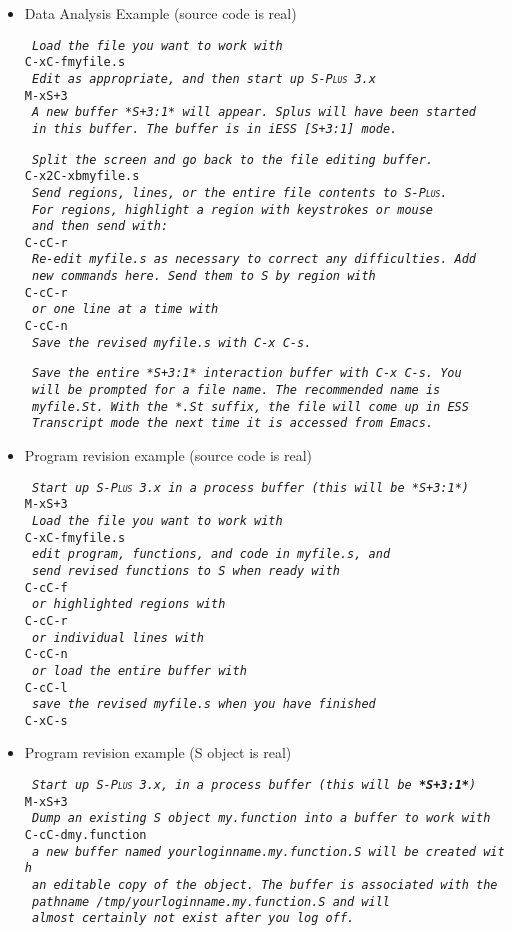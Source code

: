 \documentclass{article}
\newcommand*{\Splus}{\textsc{S-Plus}}
\newcommand*{\Scmt}[1]{\hbox{\qquad {\footnotesize \#\#} \textsl{#1}}}
\newenvironment{Salltt}{\small\begin{alltt}}{\end{alltt}}
\begin{document}
\begin{itemize}
\item Data Analysis Example (source code is real)
\begin{Salltt}
  \Scmt{Load the file you want to work with}
  C-x C-f myfile.s
  \Scmt{Edit as appropriate, and then start up \Splus~3.x}
  M-x S+3
  \Scmt{A new buffer *S+3:1* will appear.  Splus will have been started}
  \Scmt{in this buffer.  The buffer is in iESS [S+3:1] mode.}

  \Scmt{Split the screen and go back to the file editing buffer.}
  C-x 2 C-x b myfile.s
  \Scmt{Send regions, lines, or the entire file contents to \Splus.}
  \Scmt{For regions, highlight a region with keystrokes or mouse}
  \Scmt{and then send with:}
  C-c C-r
  \Scmt{Re-edit myfile.s as necessary to correct any difficulties.  Add}
  \Scmt{new commands here.  Send them to S by region with}
  C-c C-r
  \Scmt{or one line at a time with}
  C-c C-n
  \Scmt{Save the revised myfile.s with C-x C-s.}

  \Scmt{Save the entire *S+3:1* interaction buffer with C-x C-s.  You}
  \Scmt{will be prompted for a file name.  The recommended name is}
  \Scmt{myfile.St.  With the *.St suffix, the file will come up in ESS}
  \Scmt{Transcript mode the next time it is accessed from Emacs.}
  \end{Salltt}

\item Program revision example (source code is real)
  \begin{Salltt}
  \Scmt{Start up \Splus~3.x in a process buffer (this will be *S+3:1*)}
  M-x S+3
  \Scmt{Load the file you want to work with}
  C-x C-f myfile.s
  \Scmt{edit program, functions, and code in myfile.s, and}
  \Scmt{send revised functions to S when ready with}
  C-c C-f
  \Scmt{or highlighted regions with}
  C-c C-r
  \Scmt{or individual lines with}
  C-c C-n
  \Scmt{or load the entire buffer with} 
  C-c C-l
  \Scmt{save the revised myfile.s when you have finished}
  C-x C-s
  \end{Salltt}

\item Program revision example (S object is real)
  \begin{Salltt}
  \Scmt{Start up \Splus~3.x, in a process buffer (this will be \textbf{*S+3:1*})} 
  M-x S+3
  \Scmt{Dump an existing S object my.function into a buffer to work with}
  C-c C-d my.function
  \Scmt{a new buffer named \textit{yourloginname}.my.function.S will be created with}
  \Scmt{an editable copy of the object.  The buffer is associated with the}
  \Scmt{pathname {\footnotesize /tmp/\textit{yourloginname}.my.function.S} and will}
  \Scmt{almost certainly not exist after you log off.}


\end{Salltt}
\end{itemize}
\end{document}
